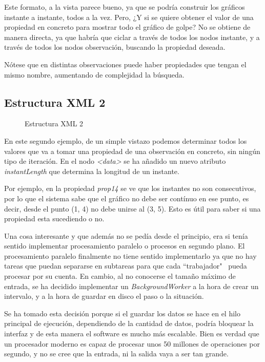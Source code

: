 Este formato, a la vista parece bueno, ya que se podr\'{i}a construir los gr\'{a}ficos instante a instante, todos a la vez. 
Pero, ¿Y si se quiere
obtener el valor de una propiedad en concreto para mostrar todo el gr\'{a}fico de golpe? No se obtiene de manera directa, ya que 
habr\'{i}a que ciclar
a trav\'{e}s de todos los nodos instante, y a trav\'{e}s de todos los nodos observaci\'{o}n, buscando la propiedad deseada. 

N\'{o}tese que en distintas observaciones puede haber propiedades que tengan el mismo nombre, aumentando de complejidad la 
b\'{u}squeda.

\subsection{Estructura XML 2}
\begin{figure}[H]
	
	\caption[Estructura XML 2]{Estructura XML 2}
	\label{Estructura XML2}
\end{figure}

En este segundo ejemplo, de un simple vistazo podemos determinar todos los valores que va a tomar una propiedad de una 
observaci\'{o}n en concreto,
sin ning\'{u}n tipo de iteraci\'{o}n. En el nodo \emph{<data>} se ha a\~{n}adido un nuevo atributo \emph{instantLength} que 
determina la longitud de un instante. 

Por ejemplo, en la propiedad \emph{prop14} se ve que los instantes no son consecutivos, por lo que el sistema sabe que el 
gr\'{a}fico no debe ser cont\'inuo en ese punto, es decir, desde el punto (1, 4) no debe unirse al 
(3, 5). Esto es \'{u}til para saber si una propiedad esta sucediendo o no.

Una cosa interesante y que adem\'as no se ped\'ia desde el principio, era si 
ten\'ia sentido implementar procesamiento paralelo o procesos en segundo plano. El 
procesamiento paralelo finalmente no tiene sentido implementarlo ya que no hay tareas
que puedan separarse en subtareas para que cada ``trabajador" \ pueda procesar por su
cuenta. En cambio, al no conocerse el tama\~no m\'aximo de entrada, se ha decidido
implementar un \emph{BackgroundWorker} a la hora de crear un intervalo, y a la hora
de guardar en disco el paso o la situaci\'on.

Se ha tomado esta decisi\'on porque si el guardar los datos se hace en el hilo principal
de ejecuci\'on, dependiendo de la cantidad de datos, podr\'ia bloquear la interfaz y
de esta manera el software es mucho m\'as escalable. Bien es
verdad que un procesador moderno es capaz de procesar unos 50 millones de operaciones por
segundo, y no se cree que la entrada, ni la salida vaya a ser tan grande.

